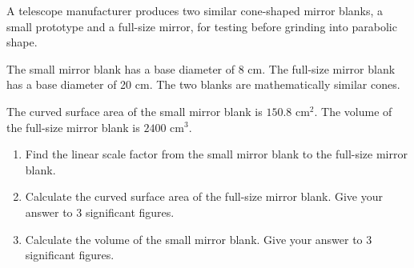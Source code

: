 \begin{question}
\noindent A telescope manufacturer produces two similar cone-shaped mirror blanks, a small prototype and a full-size mirror, for testing before grinding into parabolic shape.

\begin{center}
\end{center}

\noindent The small mirror blank has a base diameter of 8 cm. The full-size mirror blank has a base diameter of 20 cm. The two blanks are mathematically similar cones.

\noindent The curved surface area of the small mirror blank is $150.8 \text{ cm}^2$.
\noindent The volume of the full-size mirror blank is $2400 \text{ cm}^3$.

\begin{enumerate}
    \item[(a)] Find the linear scale factor from the small mirror blank to the full-size mirror blank.

    \vspace{2.5cm}

    \item[(b)] Calculate the curved surface area of the full-size mirror blank. Give your answer to 3 significant figures.

    \vspace{4cm}

    \item[(c)] Calculate the volume of the small mirror blank. Give your answer to 3 significant figures.

    \vspace{4cm}
\end{enumerate}
\end{question}
